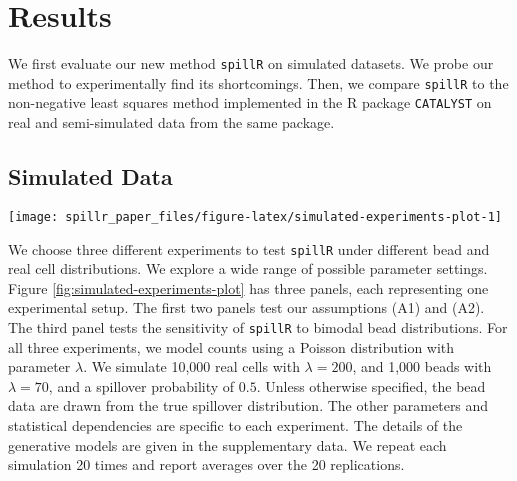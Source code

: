 \documentclass{bioinfo}
\begin{document}
\section{Results}

\label{results}

We first evaluate our new method \texttt{spillR} on simulated datasets.
We probe our method to experimentally find its shortcomings. Then, we
compare \texttt{spillR} to the non-negative least squares method
implemented in the R package \texttt{CATALYST} on real and
semi-simulated data from the same package.

\subsection{Simulated Data}

\label{simulated-data}

\begin{figure*}

{\centering \texttt{[image: spillr\_paper\_files/figure-latex/simulated-experiments-plot-1]} 

}

\caption{Three experiments testing our assumptions and sensitivity to bimodal bead distribution. For each experiment the top row are mean values over the entire range of the experimental setups. The mean values for \texttt{spillR} are computed on values not marked as \texttt{NA}, so the mean ignores the counts attributed to spillover. The bottom row are density plots for three parameter settings to illustrate the generated distributions. $Y$ is the distribution with spillover. $Y \mid Z = 1$ is the distribution without spillover. $Y \mid Z = 2$ is the spillover. mean($Y$) is the average of the distribution with spillover. mean($Y \mid Z = 1$) is the average count without spillover. \texttt{spillR} mean($Y$) is the average count after correcting $Y$.}\label{fig:simulated-experiments-plot}
\end{figure*}

We choose three different experiments to test \texttt{spillR} under
different bead and real cell distributions. We explore a wide range of
possible parameter settings. Figure \ref{fig:simulated-experiments-plot}
has three panels, each representing one experimental setup. The first
two panels test our assumptions (A1) and (A2). The third panel tests the
sensitivity of \texttt{spillR} to bimodal bead distributions. For all
three experiments, we model counts using a Poisson distribution with
parameter \(\lambda\). We simulate 10,000 real cells with
\(\lambda = 200\), and 1,000 beads with \(\lambda = 70\), and a
spillover probability of \(0.5\). Unless otherwise specified, the bead
data are drawn from the true spillover distribution. The other
parameters and statistical dependencies are specific to each experiment.
The details of the generative models are given in the supplementary
data. We repeat each simulation 20 times and report averages over the 20
replications.
\end{document}
